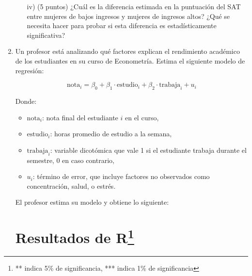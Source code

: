 \documentclass[10pt,a4paper]{article}
\begin{document}
\begin{enumerate}
\begin{enumerate}
    \item[iv)] (5 puntos) ¿Cuál es la diferencia estimada en la puntuación del SAT entre mujeres de bajos ingresos y mujeres de ingresos altos? ¿Qué se necesita hacer para probar si esta diferencia es estadísticamente significativa?
\end{enumerate}
  \item Un profesor está analizando qué factores explican el rendimiento académico de los estudiantes en su curso de Econometría. Estima el siguiente modelo de regresión:

\[
\text{nota}_i = \beta_0 + \beta_1 \cdot \text{estudio}_i + \beta_2 \cdot \text{trabaja}_i + u_i
\]

Donde:
\begin{itemize}
    \item $\text{nota}_i$: nota final del estudiante \(i\) en el curso,
    \item $\text{estudio}_i$: horas promedio de estudio a la semana,
    \item $\text{trabaja}_i$: variable dicotómica que vale 1 si el estudiante trabaja durante el semestre, 0 en caso contrario,
    \item $u_i$: término de error, que incluye factores no observados como concentración, salud, o estrés.
\end{itemize}

El profesor estima su modelo y obtiene lo siguiente: 

\section*{Resultados de R\footnote{  ** indica 5\% de significancia, *** indica 1\% de significancia}}

\noindent{}
\end{enumerate}
\end{document}
